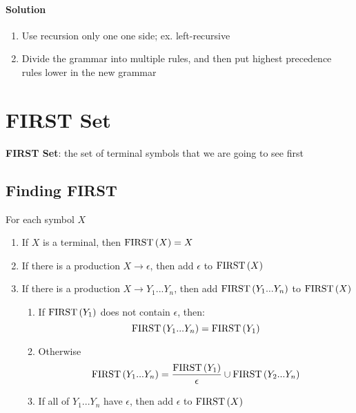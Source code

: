     \paragraph{Solution}
    \begin{enumerate}
      \item Use recursion only one one side; ex. left-recursive
      \item Divide the grammar into multiple rules, and then put highest
      precedence rules lower in the new grammar
    \end{enumerate}

\section{FIRST Set}

  \begin{definition}
    \textbf{FIRST Set}: the set of terminal symbols that we are going to see
    first
  \end{definition}

  \subsection{Finding FIRST}

    For each symbol $ X $

    \begin{enumerate}
      \item If $ X $ is a terminal, then $ \operatorname{FIRST}\left( X \right) = { X } $
      \item If there is a production $ X \to \epsilon $, then add $ \epsilon $
      to $ \operatorname{FIRST}\left( X \right) $
      \item If there is a production $ X \to Y_{1} ... Y_{n} $, then add
      $ \operatorname{FIRST}\left( Y_{1} ... Y_{n} \right) $ to $ \operatorname{FIRST}\left( X \right) $
      \begin{enumerate}
        \item If $ \operatorname{FIRST}\left( Y_{1} \right) $ does not contain $ \epsilon $,
        then:
        \begin{equation}
          \operatorname{FIRST}\left( Y_{1} ... Y_{n} \right) = \operatorname{FIRST}\left( Y_{1} \right)
        \end{equation}

        \item Otherwise
        \begin{equation}
          \operatorname{FIRST}\left( Y_{1} ... Y_{n} \right) =
            \frac{\operatorname{FIRST}\left( Y_{1} \right)}{\epsilon} \cup
            \operatorname{FIRST}\left( Y_{2} ... Y_{n} \right)
        \end{equation}

        \item If all of $ Y_{1} ... Y_{n} $ have $ \epsilon $, then add
        $ \epsilon $ to $ \operatorname{FIRST}\left( X \right) $
      \end{enumerate}
    \end{enumerate}

